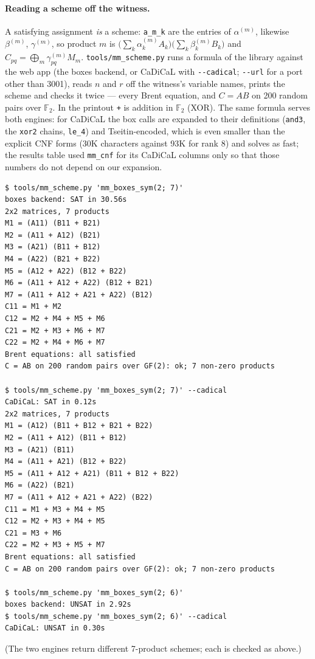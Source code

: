 \documentclass[10pt]{article}
\newcommand{\F}{\mathbb F_2}
\newcommand{\al}[1]{\alpha^{(#1)}}
\newcommand{\be}[1]{\beta^{(#1)}}
\newcommand{\ga}[1]{\gamma^{(#1)}}
\begin{document}
\paragraph{Reading a scheme off the witness.}
A satisfying assignment \emph{is} a scheme: \texttt{a\_m\_k} are the
entries of $\al{m}$, likewise $\be{m}$, $\ga{m}$, so product $m$ is
$\big(\sum_k \al{m}_k A_k\big)\big(\sum_k \be{m}_k B_k\big)$ and
$C_{pq} = \bigoplus_m \ga{m}_{pq} M_m$. \texttt{tools/mm\_scheme.py} runs
a formula of the library against the web app (the boxes backend, or CaDiCaL
with \texttt{-{}-cadical}; \texttt{-{}-url} for a port other than 3001),
reads $n$ and $r$ off the witness's variable names, prints the scheme and
checks it twice --- every Brent equation, and $C = AB$ on 200 random pairs
over $\F$. In the printout \texttt{+} is addition in $\F$ (XOR). The same
formula serves both engines: for CaDiCaL the box calls are expanded to
their definitions (\texttt{and3}, the \texttt{xor2} chains, \texttt{le\_4})
and Tseitin-encoded, which is even smaller than the explicit CNF forms
(30K characters against 93K for rank 8) and solves as fast; the results
table used \texttt{mm\_cnf} for its CaDiCaL columns only so that those
numbers do not depend on our expansion.
\begin{small}
\begin{verbatim}
$ tools/mm_scheme.py 'mm_boxes_sym(2; 7)'
boxes backend: SAT in 30.56s
2x2 matrices, 7 products
M1 = (A11) (B11 + B21)
M2 = (A11 + A12) (B21)
M3 = (A21) (B11 + B12)
M4 = (A22) (B21 + B22)
M5 = (A12 + A22) (B12 + B22)
M6 = (A11 + A12 + A22) (B12 + B21)
M7 = (A11 + A12 + A21 + A22) (B12)
C11 = M1 + M2
C12 = M2 + M4 + M5 + M6
C21 = M2 + M3 + M6 + M7
C22 = M2 + M4 + M6 + M7
Brent equations: all satisfied
C = AB on 200 random pairs over GF(2): ok; 7 non-zero products

$ tools/mm_scheme.py 'mm_boxes_sym(2; 7)' --cadical
CaDiCaL: SAT in 0.12s
2x2 matrices, 7 products
M1 = (A12) (B11 + B12 + B21 + B22)
M2 = (A11 + A12) (B11 + B12)
M3 = (A21) (B11)
M4 = (A11 + A21) (B12 + B22)
M5 = (A11 + A12 + A21) (B11 + B12 + B22)
M6 = (A22) (B21)
M7 = (A11 + A12 + A21 + A22) (B22)
C11 = M1 + M3 + M4 + M5
C12 = M2 + M3 + M4 + M5
C21 = M3 + M6
C22 = M2 + M3 + M5 + M7
Brent equations: all satisfied
C = AB on 200 random pairs over GF(2): ok; 7 non-zero products

$ tools/mm_scheme.py 'mm_boxes_sym(2; 6)'
boxes backend: UNSAT in 2.92s
$ tools/mm_scheme.py 'mm_boxes_sym(2; 6)' --cadical
CaDiCaL: UNSAT in 0.30s
\end{verbatim}
\end{small}
(The two engines return different 7-product schemes; each is checked as
above.)
\end{document}
